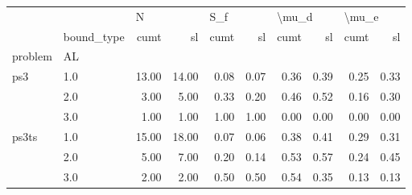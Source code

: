 \begin{tabular}{llrrrrrrrr}
\toprule
      & {} & \multicolumn{2}{l}{N} & \multicolumn{2}{l}{S\_f} & \multicolumn{2}{l}{\textbackslash mu\_d} & \multicolumn{2}{l}{\textbackslash mu\_e} \\
      & bound\_type &  cumt &    sl & cumt &   sl &  cumt &   sl &  cumt &   sl \\
problem & AL &       &       &      &      &       &      &       &      \\
\midrule
ps3 & 1.0 & 13.00 & 14.00 & 0.08 & 0.07 &  0.36 & 0.39 &  0.25 & 0.33 \\
      & 2.0 &  3.00 &  5.00 & 0.33 & 0.20 &  0.46 & 0.52 &  0.16 & 0.30 \\
      & 3.0 &  1.00 &  1.00 & 1.00 & 1.00 &  0.00 & 0.00 &  0.00 & 0.00 \\
ps3ts & 1.0 & 15.00 & 18.00 & 0.07 & 0.06 &  0.38 & 0.41 &  0.29 & 0.31 \\
      & 2.0 &  5.00 &  7.00 & 0.20 & 0.14 &  0.53 & 0.57 &  0.24 & 0.45 \\
      & 3.0 &  2.00 &  2.00 & 0.50 & 0.50 &  0.54 & 0.35 &  0.13 & 0.13 \\
\bottomrule
\end{tabular}

